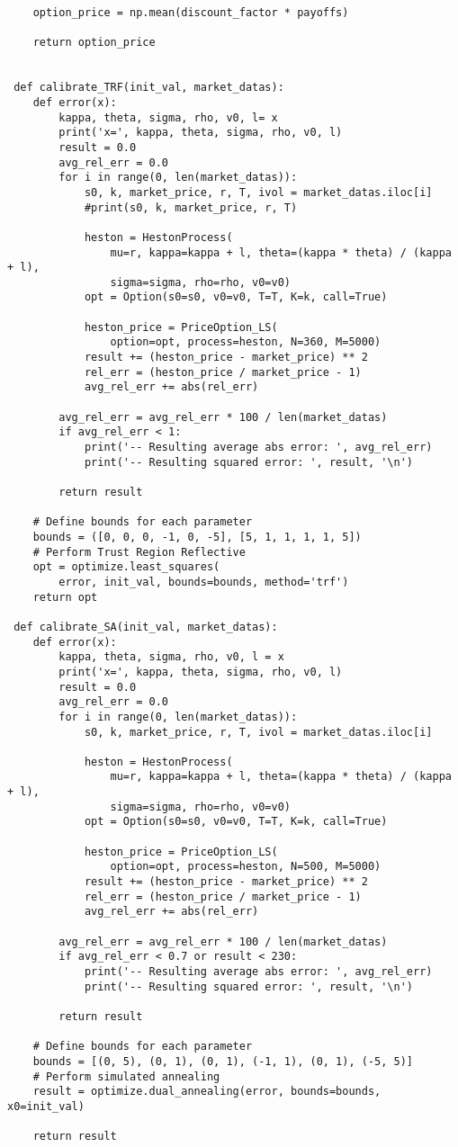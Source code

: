 \documentclass[12pt,a4paper,twoside,openany]{book}
\begin{document}
\begin{lstlisting}
 	option_price = np.mean(discount_factor * payoffs)
 	
 	return option_price
 	
 	
 def calibrate_TRF(init_val, market_datas):
 	def error(x):
 		kappa, theta, sigma, rho, v0, l= x
 		print('x=', kappa, theta, sigma, rho, v0, l)
 		result = 0.0
 		avg_rel_err = 0.0
 		for i in range(0, len(market_datas)):
 			s0, k, market_price, r, T, ivol = market_datas.iloc[i]
 			#print(s0, k, market_price, r, T)
 		
 			heston = HestonProcess(
 				mu=r, kappa=kappa + l, theta=(kappa * theta) / (kappa + l), 
 				sigma=sigma, rho=rho, v0=v0)
 			opt = Option(s0=s0, v0=v0, T=T, K=k, call=True)
 		
 			heston_price = PriceOption_LS(
 				option=opt, process=heston, N=360, M=5000)
 			result += (heston_price - market_price) ** 2
 			rel_err = (heston_price / market_price - 1)
 			avg_rel_err += abs(rel_err)
 		
 		avg_rel_err = avg_rel_err * 100 / len(market_datas)
 		if avg_rel_err < 1:
 			print('-- Resulting average abs error: ', avg_rel_err)
 			print('-- Resulting squared error: ', result, '\n')
 		
 		return result
 	
 	# Define bounds for each parameter
 	bounds = ([0, 0, 0, -1, 0, -5], [5, 1, 1, 1, 1, 5])
 	# Perform Trust Region Reflective
 	opt = optimize.least_squares(
 		error, init_val, bounds=bounds, method='trf')  
 	return opt
 
 def calibrate_SA(init_val, market_datas):
 	def error(x):
 		kappa, theta, sigma, rho, v0, l = x
 		print('x=', kappa, theta, sigma, rho, v0, l)
 		result = 0.0
 		avg_rel_err = 0.0
 		for i in range(0, len(market_datas)):
 			s0, k, market_price, r, T, ivol = market_datas.iloc[i]
 			
 			heston = HestonProcess(
 				mu=r, kappa=kappa + l, theta=(kappa * theta) / (kappa + l), 
 				sigma=sigma, rho=rho, v0=v0)
 			opt = Option(s0=s0, v0=v0, T=T, K=k, call=True)
 			
 			heston_price = PriceOption_LS(
 				option=opt, process=heston, N=500, M=5000) 
 			result += (heston_price - market_price) ** 2
 			rel_err = (heston_price / market_price - 1)
 			avg_rel_err += abs(rel_err)
  	
 		avg_rel_err = avg_rel_err * 100 / len(market_datas)
 		if avg_rel_err < 0.7 or result < 230:
 			print('-- Resulting average abs error: ', avg_rel_err)
 			print('-- Resulting squared error: ', result, '\n')
 		
 		return result
 	
 	# Define bounds for each parameter
 	bounds = [(0, 5), (0, 1), (0, 1), (-1, 1), (0, 1), (-5, 5)]
 	# Perform simulated annealing
 	result = optimize.dual_annealing(error, bounds=bounds, x0=init_val)
 	
 	return result \end{lstlisting} 	
\end{document}
